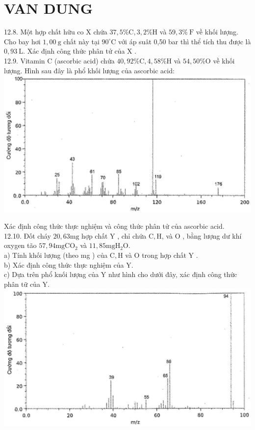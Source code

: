 \documentclass[10pt]{article}
\begin{document}
\section*{VAN DUNG}
12.8. Một hợp chất hữu co X chứa $37,5 \% \mathrm{C}, 3,2 \% \mathrm{H}$ và $59,3 \% \mathrm{~F}$ về khối lượng. Cho bay hơi $1,00 \mathrm{~g}$ chất này tại $90^{\circ} \mathrm{C}$ với áp suât 0,50 bar thì thể tích thu được là $0,93 \mathrm{~L}$. Xác định công thức phân tử của X .\\
12.9. Vitamin C (ascorbic acid) chứa $40,92 \% \mathrm{C}, 4,58 \% \mathrm{H}$ và $54,50 \% \mathrm{O}$ về khối lượng. Hình sau đây là phổ khối lượng của ascorbic acid:\\
\includegraphics[max width=\textwidth, center]{2025_10_23_fa9073eecee116ad8cf2g-43}

Xác định công thức thực nghiệm và công thức phân tử của ascorbic acid.\\
12.10. Đốt cháy $20,63 \mathrm{mg}$ hợp chất Y , chỉ chứa $\mathrm{C}, \mathrm{H}$, và O , bằng lượng dư khí oxygen tão $57,94 \mathrm{mg} \mathrm{CO}_{2}$ và $11,85 \mathrm{mg} \mathrm{H}_{2} \mathrm{O}$.\\
a) Tính khối lượng (theo mg ) của $\mathrm{C}, \mathrm{H}$ và O trong hợp chất Y .\\
b) Xác định công thức thực nghiệm của Y.\\
c) Dựa trên phổ knối lượng của Y như hình cho dưới đây, xác định công thức phân tữ của Y.\\
\includegraphics[max width=\textwidth, center]{2025_10_23_fa9073eecee116ad8cf2g-44}
\end{document}
